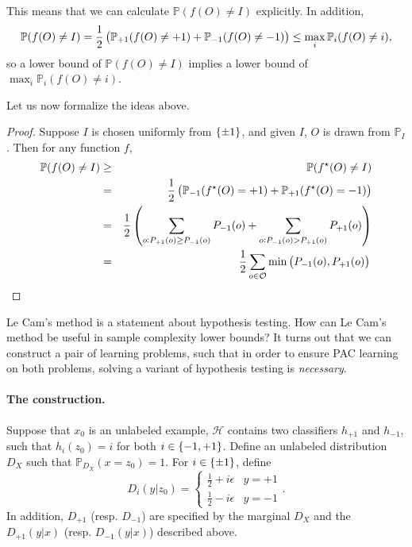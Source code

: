 \documentclass{article}
\newcommand{\PP}{\mathbb{P}}
\newcommand{\Hcal}{\mathcal{H}}
\newcommand{\Ocal}{\mathcal{O}}
\begin{document}
This means that we can calculate $\PP(f(O) \neq I)$ explicitly. In addition,
\begin{equation}
  \PP(f(O) \neq I) = \frac12 \del{\PP_{+1}(f(O) \neq +1) + \PP_{-1}(f(O) \neq -1)}
\leq \max_i \PP_{i}(f(O) \neq i),
\label{eqn:avg-worst}
\end{equation}
so a lower bound of $\PP(f(O) \neq I)$ implies a lower bound of $\max_i \PP_{i}(f(O) \neq i)$.

Let us now formalize the ideas above.

\begin{proof}
Suppose $I$ is chosen uniformly from $\cbr{\pm 1}$, and given $I$, $O$ is drawn from
$\PP_I$. Then for any function $f$,
\begin{eqnarray*}
  \PP(f(O) \neq I) &\geq& \PP(f^\star(O) \neq I) \\
   &=& \frac12 \del{\PP_{-1}(f^\star(O) = +1) + \PP_{+1}(f^\star(O) = -1)} \\
   &=& \frac12 \del{\sum_{o: P_{+1}(o) \geq P_{-1}(o)} P_{-1}(o) + \sum_{o: P_{-1}(o) > P_{+1}(o)} P_{+1}(o)} \\
   &=& \frac12 \sum_{o \in \Ocal} \min\del{P_{-1}(o), P_{+1}(o)}
   \qedhere
\end{eqnarray*}

\end{proof}

Le Cam's method is a statement about hypothesis testing.
How can Le Cam's method be useful in sample complexity lower bounds? It turns out
that we can construct a pair of learning problems, such that in order to ensure PAC
learning on both problems, solving a variant of hypothesis testing is {\em necessary}.

\paragraph{The construction.} Suppose that $x_0$ is an unlabeled example, $\Hcal$ contains two classifiers $h_{+1}$ and $h_{-1}$, such that $h_i(z_0) = i$ for both $i \in \cbr{-1,+1}$. Define an unlabeled distribution $D_X$ such that $\PP_{D_X}(x=z_0) = 1$. For $i \in \cbr{\pm 1}$, define
\[ D_i(y|z_0) = \begin{cases} \frac12 + i\epsilon & y = +1 \\ \frac12 - i\epsilon & y = -1 \end{cases}. \]
In addition, $D_{+1}$ (resp. $D_{-1}$) are specified by the marginal $D_X$ and the $D_{+1}(y|x)$ (resp. $D_{-1}(y|x)$) described above.
\end{document}
